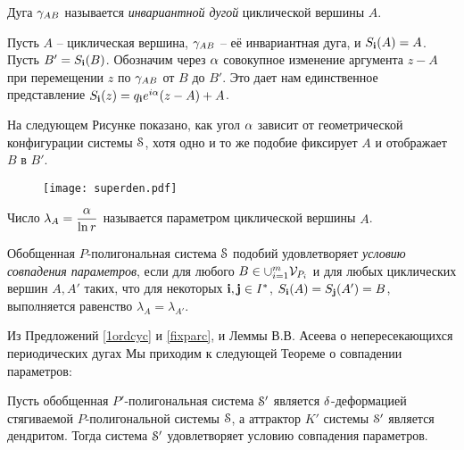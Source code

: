 \begin{definition} 
Дуга $\gamma_{AB}$ называется {\em инвариантной дугой} циклической вершины $A$.
\end{definition}

Пусть $A$ -- циклическая вершина, $\gamma_{AB}$ -- её инвариантная дуга, и $S_{\bf{i}}(A)=A$. 
Пусть $B'=S_{\bf{i}}(B)$. 
Обозначим через $\alpha$ совокупное изменение аргумента $z-A$ при перемещении $z$ по $\gamma_{AB}$ от $B$ до $B'$. 
Это дает нам единственное представление  $S_{\bf{i}}(z)=q_{\bf{i}} e^{i\alpha}(z-A)+A$. 

\begin{remark} 
На следующем Рисунке показано, как угол $\alpha$ зависит от геометрической конфигурации системы ${\EuScript S}$, хотя одно и то же подобие фиксирует $A$ и отображает $B$ в $B'$.
\end{remark}

\begin{figure}[H]
\centering
\texttt{[image: superden.pdf]}
% 
\end{figure}

\begin{definition}
Число $\lambda_A=\dfrac{\alpha}{\ln{r}}$ называется параметром циклической вершины $A$.
\end{definition}

\begin{definition}
Обобщенная $P$-полигональная система ${\EuScript S}$ подобий удовлетворяет {\em условию совпадения параметров}, если для любого $B \in\cup_{i=1}^m  {\mathcal V}_{P_i}$ и для любых циклических вершин $A,A'$  таких, что для некоторых ${\bf{i}},{\bf{j}}\in I^*$,  $S_{\bf{i}}(A)=S_{\bf{j}}(A')=B$, выполняется равенство $\lambda _{A}=\lambda _{A'}$.
\end{definition}


Из Предложений \ref{1ordcyc} и \ref{fixparc}, и Леммы В.В. Асеева о непересекающихся периодических дугах \cite[Lemma 3.1]{ATK} Мы приходим к следующей Теореме о совпадении параметров:

\begin{theorem}\label{PMT}
Пусть обобщенная $P'$-полигональная система ${\EuScript S}'$ является  $\delta$-деформацией стягиваемой $P$-полигональной системы  ${\EuScript S}$, а аттрактор $K'$ системы ${\EuScript S}'$ является дендритом. 
Тогда система ${\EuScript S}'$ удовлетворяет условию совпадения параметров.
\end{theorem}

